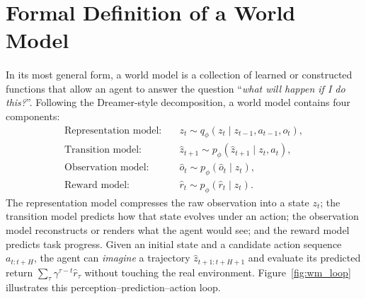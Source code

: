 \documentclass[12pt,a4paper,final]{extreport}
\begin{document}
\section{Formal Definition of a World Model}

\paragraph{} In its most general form, a world model is a collection of learned or constructed functions that allow an agent to answer the question ``\emph{what will happen if I do this?}''. Following the Dreamer-style decomposition, a world model contains four components:
\begin{align}
\text{Representation model:}\quad & z_t \sim q_\phi(z_t \mid z_{t-1}, a_{t-1}, o_t), \label{eq:wm_rep}\\
\text{Transition model:}\quad & \hat{z}_{t+1} \sim p_\phi(\hat{z}_{t+1} \mid z_t, a_t), \label{eq:wm_trans}\\
\text{Observation model:}\quad & \hat{o}_t \sim p_\phi(\hat{o}_t \mid z_t), \label{eq:wm_obs}\\
\text{Reward model:}\quad & \hat{r}_t \sim p_\phi(\hat{r}_t \mid z_t). \label{eq:wm_rew}
\end{align}
The representation model compresses the raw observation into a state $z_t$; the transition model predicts how that state evolves under an action; the observation model reconstructs or renders what the agent would see; and the reward model predicts task progress. Given an initial state and a candidate action sequence $a_{t:t+H}$, the agent can \emph{imagine} a trajectory $\hat{z}_{t+1:t+H+1}$ and evaluate its predicted return $\sum_{\tau} \gamma^{\tau-t}\hat{r}_\tau$ without touching the real environment. Figure~\ref{fig:wm_loop} illustrates this perception--prediction--action loop.
\end{document}
